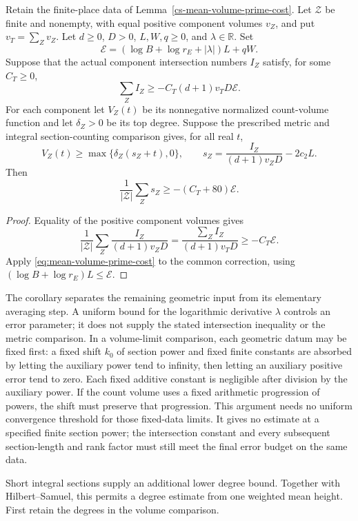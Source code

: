 \begin{corollary}
\label{cs-mean-volume-intersection}
Retain the finite-place data of
Lemma~\ref{cs-mean-volume-prime-cost}. Let $\mathcal Z$ be finite and
nonempty, with equal positive component volumes $v_Z$, and put
$v_T=\sum_Zv_Z$. Let $d\ge0$, $D>0$, $L,W,q\ge0$, and $\lambda\in\mathbb R$.
Set
\[
 \mathcal E=(\log B+\log r_E+|\lambda|)L+qW.
\]
Suppose that the actual component intersection numbers $I_Z$ satisfy,
for some $C_T\ge0$,
\[
 \sum_ZI_Z\ge-C_T(d+1)v_TD\mathcal E.
\]
For each component let $V_Z(t)$ be its nonnegative normalized
count-volume function and let $\delta_Z>0$ be its top degree.
Suppose the prescribed metric and integral section-counting comparison
gives, for all real $t$,
\[
 V_Z(t)\ge\max\{\delta_Z(s_Z+t),0\},\qquad
 s_Z=\frac{I_Z}{(d+1)v_ZD}-2c_2L.
\]
Then
\begin{equation}
\label{eq:mean-volume-intersection}
 \frac1{|\mathcal Z|}\sum_Zs_Z\ge-(C_T+80)\mathcal E.
\end{equation}
\end{corollary}

\begin{proof}
Equality of the positive component volumes gives
\[
 \frac1{|\mathcal Z|}\sum_Z\frac{I_Z}{(d+1)v_ZD}
   =\frac{\sum_ZI_Z}{(d+1)v_TD}\ge-C_T\mathcal E.
\]
Apply \eqref{eq:mean-volume-prime-cost} to the common correction,
using $(\log B+\log r_E)L\le\mathcal E$.
\end{proof}

The corollary separates the remaining geometric input from its
elementary averaging step. A uniform bound for the logarithmic
derivative $\lambda$ controls an error parameter; it does not supply
the stated intersection inequality or the metric comparison. In a
volume-limit comparison, each geometric datum may be fixed first:
a fixed shift $k_0$ of section power and fixed finite constants are
absorbed by letting the auxiliary power tend to infinity, then letting
an auxiliary positive error tend to zero. Each fixed additive constant
is negligible after division by the auxiliary power. If the count
volume uses a fixed arithmetic progression of powers, the shift must
preserve that progression.
This argument needs no uniform convergence threshold for those fixed-data
limits. It gives no estimate at a specified finite section power;
the intersection constant and every subsequent section-length and rank
factor must still meet the final error budget on the same data.

Short integral sections supply an additional lower degree bound.
Together with Hilbert--Samuel, this permits a degree estimate from one
weighted mean height. First retain the degrees in the volume comparison.

